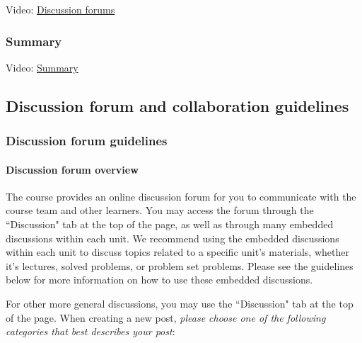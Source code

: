 \documentclass[pdftex, brazil, 12pt, twoside]{article}
\begin{document}
Video: \href{https://www.youtube.com/watch?v=Q-rY8DIwYgg}{Discussion forums}

\subsubsection{Summary}
\label{ovw0-edx-}

Video: \href{https://www.youtube.com/watch?v=RQdyRhHDlRo}{Summary}


\subsection{Discussion forum and collaboration guidelines}
\label{ovw0-forum}

\subsubsection{Discussion forum guidelines}
\label{ovw0-forum-guide}

\paragraph{Discussion forum overview} The course provides an online discussion
forum for you to communicate with the course
team and other learners. You may access the forum through the “Discussion" tab at the
top of the page, as well as through many embedded discussions within each unit.
We recommend using the embedded discussions within each unit to discuss topics related
to a specific unit's materials, whether it's lectures, solved problems, or problem
set problems. Please see the guidelines below for more information on how to use
these embedded discussions.

For other more general discussions, you may use the “Discussion" tab at the top of
the page. When creating a new post, \emph{please choose one of the following categories that
best describes your post}:
\end{document}
